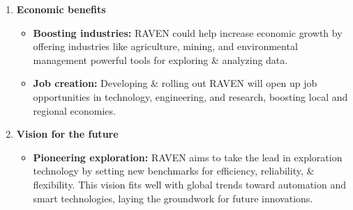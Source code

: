 {\begin{enumerate}[label=\textbf{\arabic*}.]
		\item \textbf{Economic benefits}
		\begin{itemize}
			\item \textbf{Boosting industries:} RAVEN could help increase economic growth by offering industries like agriculture, mining, and environmental management powerful tools for exploring \& analyzing data. 
			\item \textbf{Job creation:} Developing \& rolling out RAVEN will open up job opportunities in technology, engineering, and research, boosting local and regional economies.
		\end{itemize}
		
		\item \textbf{Vision for the future}
		\begin{itemize}
			\item \textbf{Pioneering exploration:} RAVEN aims to take the lead in exploration technology by setting new benchmarks for efficiency, reliability, \& flexibility. This vision fits well with global trends toward automation and smart technologies, laying the
			groundwork for future innovations.
		\end{itemize}
		
	\end{enumerate}
}